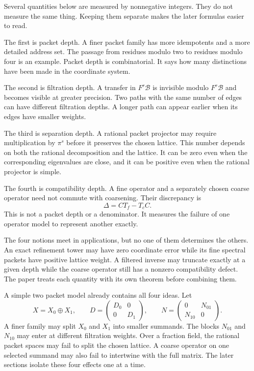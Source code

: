 \documentclass{aomart}
\theoremstyle{definition}
\theoremstyle{remark}
\newcommand{\Bcal}{\mathcal B}
\begin{document}
Several quantities below are measured by nonnegative integers.  They do not measure the same thing.  Keeping them separate makes the later formulas easier to read.

The first is packet depth.  A finer packet family has more idempotents and a more detailed address set.  The passage from residues modulo two to residues modulo four is an example.  Packet depth is combinatorial.  It says how many distinctions have been made in the coordinate system.

The second is filtration depth.  A transfer in $F^r\Bcal$ is invisible modulo $F^r\Bcal$ and becomes visible at greater precision.  Two paths with the same number of edges can have different filtration depths.  A longer path can appear earlier when its edges have smaller weights.

The third is separation depth.  A rational packet projector may require multiplication by $\pi^s$ before it preserves the chosen lattice.  This number depends on both the rational decomposition and the lattice.  It can be zero even when the corresponding eigenvalues are close, and it can be positive even when the rational projector is simple.

The fourth is compatibility depth.  A fine operator and a separately chosen coarse operator need not commute with coarsening.  Their discrepancy is
\[
\Delta=CT_f-T_cC.
\]
This is not a packet depth or a denominator.  It measures the failure of one operator model to represent another exactly.

The four notions meet in applications, but no one of them determines the others.  An exact refinement tower may have zero coordinate error while its fine spectral packets have positive lattice weight.  A filtered inverse may truncate exactly at a given depth while the coarse operator still has a nonzero compatibility defect.  The paper treats each quantity with its own theorem before combining them.

A simple two packet model already contains all four ideas.  Let
\[
X=X_0\oplus X_1,
\qquad
D=\begin{pmatrix}D_0&0\\0&D_1\end{pmatrix},
\qquad
N=\begin{pmatrix}0&N_{01}\\N_{10}&0\end{pmatrix}.
\]
A finer family may split $X_0$ and $X_1$ into smaller summands.  The blocks $N_{01}$ and $N_{10}$ may enter at different filtration weights.  Over a fraction field, the rational packet spaces may fail to split the chosen lattice.  A coarse operator on one selected summand may also fail to intertwine with the full matrix.  The later sections isolate these four effects one at a time.
\end{document}
